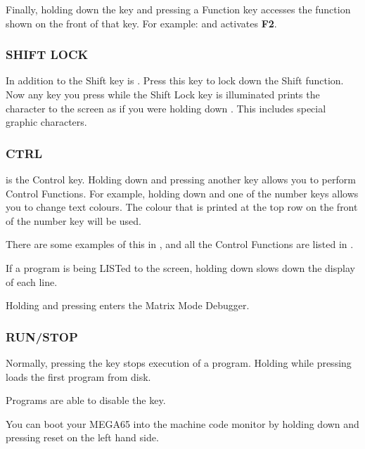 Finally, holding down the  key and pressing a Function key accesses the function shown on the front of that key. For example:  and  activates \textbf{F2}.


\subsubsection{SHIFT LOCK}

In addition to the Shift key is . Press this key to lock down the Shift function. Now any key you press while the Shift Lock key is illuminated prints the character to the screen as if you were holding down . This includes special graphic characters.

\subsubsection{CTRL}

 is the Control key. Holding down  and pressing another key allows you to perform Control Functions. For example, holding down  and one of the number keys allows you to change text colours. The colour that is printed at the top row on the front of the number key will be used.

There are some examples of this in , and all the Control Functions are listed in .

If a program is being LISTed to the screen, holding down  slows down the display of each line.

Holding  and pressing \megakey{*} enters the Matrix Mode Debugger.

\subsubsection{RUN/STOP}

Normally, pressing the  key stops execution of a program. Holding  while pressing  loads the first program from disk.

Programs are able to disable the  key.

You can boot your MEGA65 into the machine code monitor by holding down  and pressing reset on the left hand side.

